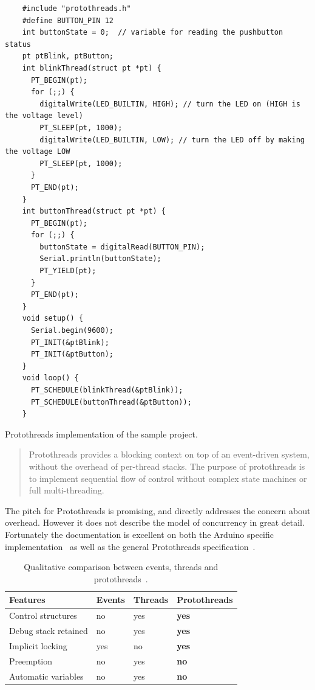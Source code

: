 \begin{listing}[htb!]
  \centering
  \begin{verbatim}
    #include "protothreads.h"
    #define BUTTON_PIN 12
    int buttonState = 0;  // variable for reading the pushbutton status
    pt ptBlink, ptButton;
    int blinkThread(struct pt *pt) {
      PT_BEGIN(pt);
      for (;;) {
        digitalWrite(LED_BUILTIN, HIGH); // turn the LED on (HIGH is the voltage level)
        PT_SLEEP(pt, 1000);
        digitalWrite(LED_BUILTIN, LOW); // turn the LED off by making the voltage LOW
        PT_SLEEP(pt, 1000);
      }
      PT_END(pt);
    }
    int buttonThread(struct pt *pt) {
      PT_BEGIN(pt);
      for (;;) {
        buttonState = digitalRead(BUTTON_PIN);
        Serial.println(buttonState);
        PT_YIELD(pt);
      }
      PT_END(pt);
    }
    void setup() {
      Serial.begin(9600);
      PT_INIT(&ptBlink);
      PT_INIT(&ptButton);
    }
    void loop() {
      PT_SCHEDULE(blinkThread(&ptBlink));
      PT_SCHEDULE(buttonThread(&ptButton));
    }
  \end{verbatim}
  \caption{Protothreads implementation of the sample project.}
  \label{lst:protothreadsexample}
\end{listing}


\blockcquote{Artin2020, AdamDunkelProtothreads}{Protothreads provides a blocking context on top of an event-driven system, without the overhead of per-thread stacks. The purpose of protothreads is to implement sequential flow of control without complex state machines or full multi-threading.}

The pitch for Protothreads is promising, and directly addresses the concern about overhead. However it does not describe the model of concurrency in great detail. Fortunately the documentation is excellent on both the Arduino specific implementation~\cite{Artin2020} as well as the general Protothreads specification~\cite{AdamDunkelProtothreads}.


\begin{table}[htb!]
  \centering
  \begin{tabular}{lll>{\bfseries}l}
    \toprule
    Features             & Events & Threads & Protothreads \\ \midrule
    Control structures   & no     & yes     & yes          \\
    Debug stack retained & no     & yes     & yes          \\
    Implicit locking     & yes    & no      & yes          \\
    Preemption           & no     & yes     & no           \\
    Automatic variables  & no     & yes     & no
  \end{tabular}
  \caption{Qualitative comparison between events, threads and protothreads~\cite{dunkels05using}.}
  \label{tab:protothreadscomparison}
\end{table}



